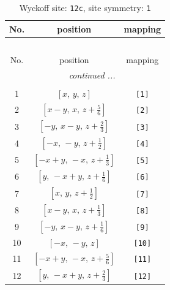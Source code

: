 \documentclass[fleqn,8pt]{jsarticle}
\begin{document}
\begin{longtable}{ccc}
\caption{Wyckoff site: {\tt 12c}, site symmetry: {\tt 1}}
 \\
 \hline \hline
No. & position & mapping \\ \hline \endfirsthead

\multicolumn{2}{l}{\tablename\ \thetable{}} \\
 \hline \hline
No. & position & mapping \\ \hline \endhead

 \hline \hline
\multicolumn{2}{r}{\footnotesize\it continued ...} \\ \endfoot

 \hline \hline
\multicolumn{2}{r}{} \\ \endlastfoot

1 & $\left[ x,\, y,\, z \right]$ & {\tt [1]} \\ \hline
2 & $\left[ x - y,\, x,\, z + \frac{5}{6} \right]$ & {\tt [2]} \\ \hline
3 & $\left[ - y,\, x - y,\, z + \frac{2}{3} \right]$ & {\tt [3]} \\ \hline
4 & $\left[ - x,\, - y,\, z + \frac{1}{2} \right]$ & {\tt [4]} \\ \hline
5 & $\left[ - x + y,\, - x,\, z + \frac{1}{3} \right]$ & {\tt [5]} \\ \hline
6 & $\left[ y,\, - x + y,\, z + \frac{1}{6} \right]$ & {\tt [6]} \\ \hline
7 & $\left[ x,\, y,\, z + \frac{1}{2} \right]$ & {\tt [7]} \\ \hline
8 & $\left[ x - y,\, x,\, z + \frac{1}{3} \right]$ & {\tt [8]} \\ \hline
9 & $\left[ - y,\, x - y,\, z + \frac{1}{6} \right]$ & {\tt [9]} \\ \hline
10 & $\left[ - x,\, - y,\, z \right]$ & {\tt [10]} \\ \hline
11 & $\left[ - x + y,\, - x,\, z + \frac{5}{6} \right]$ & {\tt [11]} \\ \hline
12 & $\left[ y,\, - x + y,\, z + \frac{2}{3} \right]$ & {\tt [12]} \\
\end{longtable}
\end{document}
